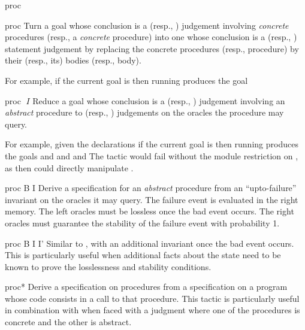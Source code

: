 \begin{tactic}{proc}
  \begin{tsyntax}{proc}
    Turn a goal whose conclusion is a \prhl (resp., \phl) judgement
    involving \emph{concrete} procedures (resp., a \emph{concrete}
    procedure) into one whose conclusion is a \prhl (resp., \phl)
    statement judgement by replacing the concrete procedures (resp.,
    procedure) by their (resp., its) bodies (resp., body).

  \bigskip
  For example, if the current goal is
   then
  running 
  produces the goal
  \end{tsyntax}

  \begin{tsyntax}{proc $\;I$}
    Reduce a goal whose conclusion is a \prhl (resp., \phl) judgement
    involving an \emph{abstract} procedure to \prhl (resp., \phl)
    judgements on the oracles the procedure may query.

  \bigskip
  For example, given the declarations
  if the current goal is
   then
  running 
  produces the goals
  and
  and
  and
  The tactic would fail without the module restriction  on
  , as then  could directly manipulate .
  \end{tsyntax}

  \begin{tsyntax}{proc B I}
  Derive a specification for an \emph{abstract} procedure from an
  ``upto-failure'' invariant on the oracles it may query. The failure
  event  is evaluated in the right memory. The left oracles
  must be lossless once the bad event occurs. The right oracles must
  guarantee the stability of the failure event with probability 1.
  \end{tsyntax}

  \begin{tsyntax}{proc B I I'}
  Similar to , with an additional invariant once the bad
  event occurs. This is particularly useful when additional facts
  about the state need to be known to prove the losslessness and
  stability conditions.
  \end{tsyntax}

  \begin{tsyntax}{proc*}
  Derive a specification on procedures from a specification on a
  program whose code consists in a call to that procedure. This tactic
  is particularly useful in combination with  when
  faced with a \prhl judgment where one of the procedures is concrete
  and the other is abstract.
  \end{tsyntax}
\end{tactic}

